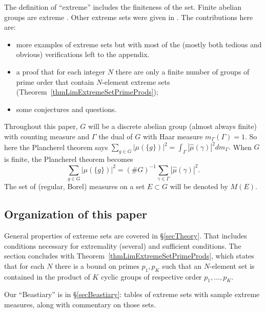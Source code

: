 \documentclass[letter,11pt]{amsart}
\numberwithin{theorem}{section}
\theoremstyle{remark}
\numberwithin{equation}{section}
\newcommand{\secref}[1]{\S\ref{#1}}
\newcommand{\thmref}[1]{Theorem~\ref{#1}}
\begin{document}
The definition of ``extreme'' includes the finiteness of the set.
Finite abelian groups are extreme \cite{MR0458059}. Other extreme sets were given in \cite{MR627683}. The 
contributions here are: 
\begin{itemize}

\item 
more examples of extreme
 sets but with most of the (mostly both tedious and obvious) verifications left to the %
 appendix.%
 
 \item 
 a proof that for each integer $N$ 
 there are only a finite number of groups of prime
 order that contain $N$-element extreme sets (\thmref{thmLimExtremeSetPrimeProds});
 
 \item 
 some conjectures and questions.
 
 

\end{itemize}
Throughout this paper, $G$ will be a discrete abelian group (almost always finite) with counting measure
and $\Gamma$ the dual of $G$ with Haar measure $m_\Gamma(\Gamma) = 1$. So here the
Plancherel theorem says $\sum_{g\in G}|\mu(\{g\})|^2 
= \int_\Gamma|\widehat\mu(\gamma)|^2dm_{\Gamma}.$ 
When $G$ is finite,   the
Plancherel theorem  becomes 
\[
\sum_{g\in G}|\mu(\{g\})|^2 = (\#G)^{-1}\sum_{\gamma\in\Gamma}|\widehat\mu(\gamma)|^2.
\]
The set  of (regular, Borel) measures on a set $E\subset G$ will be 
denoted by $M(E)$.

\bigbreak
\subsection*{Organization of this paper} General properties of extreme sets are covered in 
\secref{secTheory}. That includes conditions necessary for extremality (several) and sufficient conditions. The section
concludes with \thmref{thmLimExtremeSetPrimeProds}, which states that
 for each $N$ there is a bound on primes $p_1, p_K$ such that an $N$-element set is
contained in the product of $K$ cyclic groups of respective order $p_1, \dots, p_K$.
 
Our ``Beastiary'' is in \secref{secBeastiary}: tables of extreme sets with sample extreme measures, along with commentary
on those sets.
\end{document}
